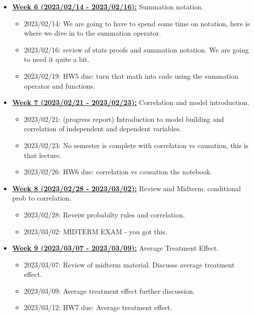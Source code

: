 \documentclass[11pt]{article}
\begin{document}
\begin{itemize}
\begin{itemize}
  \end{itemize}


  \item \underline{\textbf{Week 6 (2023/02/14 - 2023/02/16):}} Summation notation. 
  \begin{itemize}
    \item 2023/02/14: We are going to have to spend some time on notation, here is where we dive  in to the summation operator.
    \item 2023/02/16: review of stats proofs and summation notation. We are going to need it quite a bit. 
    \item 2023/02/19: HW5 due: turn that math into code using the summation operator and functions.

  \end{itemize}


  \item \underline{\textbf{Week 7 (2023/02/21 - 2023/02/23):}} Correlation and model introduction. 
  \begin{itemize}
    \item 2023/02/21: (progress report) Introduction to model building and correlation of independent and dependent variables.
    \item 2023/02/23: No semester is complete with correlation vs causation, this is that lecture. 
    \item 2023/02/26: HW6 due: correlation vs causation the notebook. 
  \end{itemize}

  \item \underline{\textbf{Week 8 (2023/02/28 - 2023/03/02):}} Review and Midterm: conditional prob to correlation.
  \begin{itemize}
    \item 2023/02/28: Reveiw probabilty rules and correlation. 
    \item 2023/03/02: MIDTERM EXAM - you got this. 
  \end{itemize}

  \item \underline{\textbf{Week 9 (2023/03/07 - 2023/03/09):}} Average Treatment Effect.
  \begin{itemize}
    \item 2023/03/07: Review of midterm material. Discusss average treatment effect. 
    \item 2023/03/09: Average treatment effect further discussion. 
    \item 2023/03/12: HW7 due: Average treatment effect. 
  \end{itemize}


\end{itemize}
\end{document}
